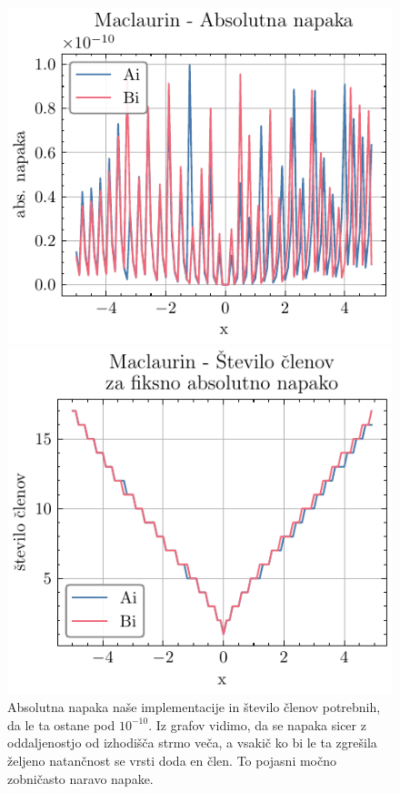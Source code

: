 \documentclass[slovene,11pt,a4paper]{article}
\begin{document}
\begin{figure}[ht]
  \centering
  \begin{minipage}{0.48\textwidth}
    \centering
    \includegraphics[width=\linewidth]{graphs/mac_abs_err.pdf}
  \end{minipage}\hfill
  \begin{minipage}{0.48\textwidth}
    \centering
    \includegraphics[width=\linewidth]{graphs/mac_abs_err_n.pdf}
  \end{minipage}
  \caption{Absolutna napaka naše implementacije in število členov potrebnih, da le ta ostane pod $10^{-10}$. Iz grafov vidimo, da se napaka sicer z oddaljenostjo od izhodišča strmo veča, a vsakič ko bi le ta zgrešila željeno natančnost se vrsti doda en člen. To pojasni močno zobničasto naravo napake.}
  \label{fig: mac_abs_err}
\end{figure}
\end{document}
